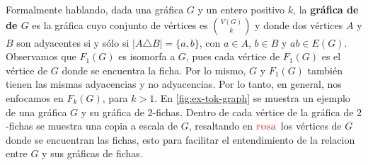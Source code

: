 Formalmente hablando, dada una gr\'afica $G$ y un entero positivo $k$, la
\textbf{gr\'afica de}  \textbf{de
$G$} es la gr\'afica cuyo conjunto de v\'ertices es
$\binom{V(G)}{k}$ y donde dos v\'ertices $A$ y $B$ son adyacentes si y s\'olo si
$|A \triangle B| = \{a,b\}$, con $a \in A$, $b \in B$ y $ab \in E(G)$.
Observamos que $F_1(G)$ es isomorfa a $G$, pues cada v\'ertice de $F_1(G)$ es el
v\'ertice de $G$ donde se encuentra la ficha. Por lo mismo, $G$ y $F_1(G)$
tambi\'en tienen las mismas adyacencias y no adyacencias. Por lo tanto, en
general, nos enfocamos en $F_k(G)$, para $k > 1$. En \cref{fig:ex-tok-graph} se
muestra un ejemplo de una gr\'afica $G$ y su gr\'afica de $2$-fichas. Dentro de
cada v\'ertice de la gr\'afica de $2$-fichas se muestra una copia a escala de
$G$, resaltando en ${\color{rosa}\bf rosa}$ los v\'ertices de $G$ donde se
encuentran las fichas, esto para facilitar el entendimiento de la relacion entre
$G$ y sus gr\'aficas de fichas.


